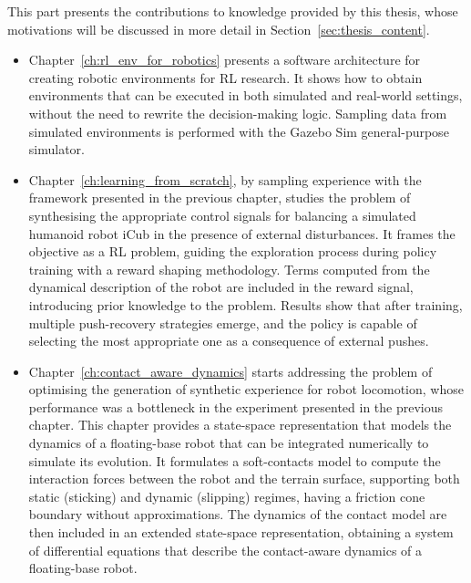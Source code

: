 This part presents the contributions to knowledge provided by this thesis, whose motivations will be discussed in more detail in Section~\ref{sec:thesis_content}.

\begin{itemize}
    \item Chapter~\ref{ch:rl_env_for_robotics} presents a software architecture for creating robotic environments for \ac{RL} research. It shows how to obtain environments that can be executed in both simulated and real-world settings, without the need to rewrite the decision-making logic. Sampling data from simulated environments is performed with the Gazebo Sim general-purpose simulator.
    \item Chapter~\ref{ch:learning_from_scratch}, by sampling experience with the framework presented in the previous chapter, studies the problem of synthesising the appropriate control signals for balancing a simulated humanoid robot iCub in the presence of external disturbances.
    It frames the objective as a \ac{RL} problem, guiding the exploration process during policy training with a reward shaping methodology.
    Terms computed from the dynamical description of the robot are included in the reward signal, introducing prior knowledge to the problem.
    Results show that after training, multiple push-recovery strategies emerge, and the policy is capable of selecting the most appropriate one as a consequence of external pushes.
    \item Chapter~\ref{ch:contact_aware_dynamics} starts addressing the problem of optimising the generation of synthetic experience for robot locomotion, whose performance was a bottleneck in the experiment presented in the previous chapter. This chapter provides a state-space representation that models the dynamics of a floating-base robot that can be integrated numerically to simulate its evolution. It formulates a soft-contacts model to compute the interaction forces between the robot and the terrain surface, supporting both static (sticking) and dynamic (slipping) regimes, having a friction cone boundary without approximations. The dynamics of the contact model are then included in an extended state-space representation, obtaining a system of differential equations that describe the contact-aware dynamics of a floating-base robot.

\end{itemize}
